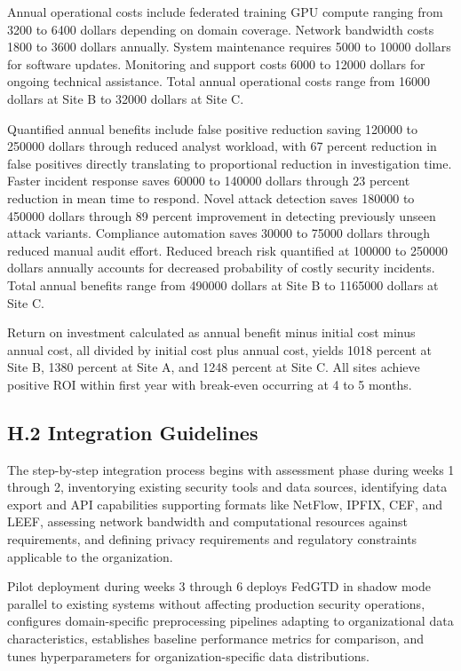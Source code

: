 \documentclass[12pt,a4paper]{article}
\theoremstyle{definition}
\begin{document}
Annual operational costs include federated training GPU compute ranging from 3200 to 6400 dollars depending on domain coverage. Network bandwidth costs 1800 to 3600 dollars annually. System maintenance requires 5000 to 10000 dollars for software updates. Monitoring and support costs 6000 to 12000 dollars for ongoing technical assistance. Total annual operational costs range from 16000 dollars at Site B to 32000 dollars at Site C.

Quantified annual benefits include false positive reduction saving 120000 to 250000 dollars through reduced analyst workload, with 67 percent reduction in false positives directly translating to proportional reduction in investigation time. Faster incident response saves 60000 to 140000 dollars through 23 percent reduction in mean time to respond. Novel attack detection saves 180000 to 450000 dollars through 89 percent improvement in detecting previously unseen attack variants. Compliance automation saves 30000 to 75000 dollars through reduced manual audit effort. Reduced breach risk quantified at 100000 to 250000 dollars annually accounts for decreased probability of costly security incidents. Total annual benefits range from 490000 dollars at Site B to 1165000 dollars at Site C.

Return on investment calculated as annual benefit minus initial cost minus annual cost, all divided by initial cost plus annual cost, yields 1018 percent at Site B, 1380 percent at Site A, and 1248 percent at Site C. All sites achieve positive ROI within first year with break-even occurring at 4 to 5 months.

\subsection{H.2 Integration Guidelines}

The step-by-step integration process begins with assessment phase during weeks 1 through 2, inventorying existing security tools and data sources, identifying data export and API capabilities supporting formats like NetFlow, IPFIX, CEF, and LEEF, assessing network bandwidth and computational resources against requirements, and defining privacy requirements and regulatory constraints applicable to the organization.

Pilot deployment during weeks 3 through 6 deploys FedGTD in shadow mode parallel to existing systems without affecting production security operations, configures domain-specific preprocessing pipelines adapting to organizational data characteristics, establishes baseline performance metrics for comparison, and tunes hyperparameters for organization-specific data distributions.
\end{document}
